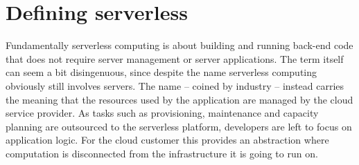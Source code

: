 \documentclass[utf8,english]{gradu3}
\begin{document}


\section{Defining serverless} \label{sec:definingServerless}


Fundamentally serverless computing is about building and running back-end code that does not require server management or server applications. The term itself can seem a bit disingenuous, since despite the name serverless computing obviously still involves servers. The name -- coined by industry -- instead carries the meaning that the resources used by the application are managed by the cloud service provider. As tasks such as provisioning, maintenance and capacity planning are outsourced to the serverless platform, developers are left to focus on application logic. For the cloud customer this provides an abstraction where computation is disconnected from the infrastructure it is going to run on. \parencite{robert2016serverlessarchitectures,cncf18serverlessWG}
\end{document}
